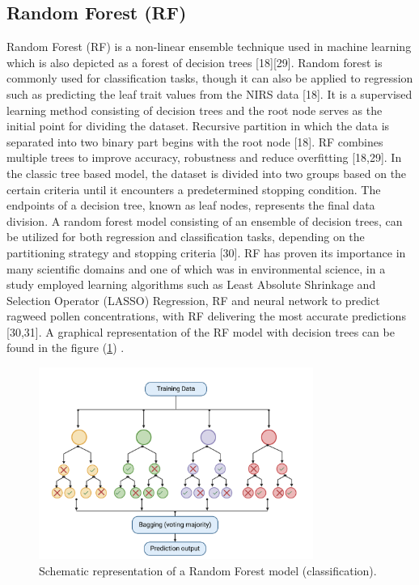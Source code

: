 \documentclass[12pt,a4paper]{report}
\begin{document}
\subsection{Random Forest (RF)}
Random Forest (RF) is a non-linear ensemble technique used in machine learning which is also depicted as a forest of decision trees [18][29]. Random forest is commonly used for classification tasks, though it can also be 
applied to regression such as predicting the leaf trait values from the NIRS data [18]. It is a supervised learning method consisting of decision trees and the root node serves as the initial point for dividing the dataset. 
Recursive partition in which the data is separated into two binary part begins with the root node [18]. RF combines multiple trees to improve accuracy, robustness and reduce overfitting [18,29].
In the classic tree based model, the dataset is divided into two groups based on the certain criteria until it encounters a predetermined stopping condition. The endpoints of a decision tree, known as leaf nodes, 
represents the final data division. A random forest model consisting of an ensemble of decision trees, can be utilized for both regression and classification tasks, depending on the partitioning strategy and stopping criteria [30]. 
RF has proven its importance in many scientific domains and one of which was in environmental science, in a study employed learning algorithms such as Least Absolute Shrinkage and Selection Operator (LASSO) Regression, RF and neural network to 
predict ragweed pollen concentrations, with RF delivering the most accurate predictions [30,31]. A graphical representation of the RF model with decision trees can be found in the figure (\ref{fig:rf}) . \\

\begin{figure}[h]
    \centering
    \includegraphics[width=0.8\textwidth]{Figures/rf.png}
    \caption{Schematic representation of a Random Forest model (classification).}
    \label{fig:rf}
\end{figure}
\end{document}
